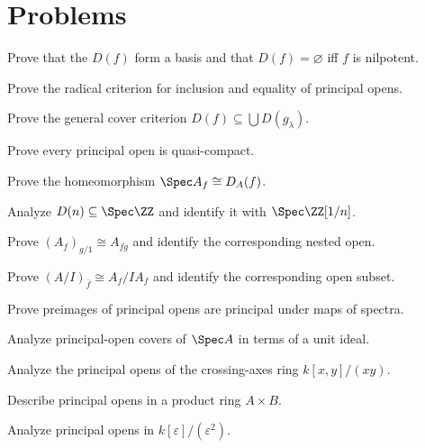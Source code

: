\section{Problems}
\ifdefined\FullProblemDossiers

\else
\begin{problem}Prove that the $D(f)$ form a basis and that $D(f)=\varnothing$ iff $f$ is nilpotent.\end{problem}
\begin{problem}Prove the radical criterion for inclusion and equality of principal opens.\end{problem}
\begin{problem}Prove the general cover criterion $D(f)\subseteq\bigcup D(g_\lambda)$.\end{problem}
\begin{problem}Prove every principal open is quasi-compact.\end{problem}
\begin{problem}Prove the homeomorphism $\Spec A_f\cong D_A(f)$.\end{problem}
\begin{problem}Analyze $D(n)\subseteq\Spec\ZZ$ and identify it with $\Spec\ZZ[1/n]$.\end{problem}
\begin{problem}Prove $(A_f)_{g/1}\cong A_{fg}$ and identify the corresponding nested open.\end{problem}
\begin{problem}Prove $(A/I)_{\bar f}\cong A_f/IA_f$ and identify the corresponding open subset.\end{problem}
\begin{problem}Prove preimages of principal opens are principal under maps of spectra.\end{problem}
\begin{problem}Analyze principal-open covers of $\Spec A$ in terms of a unit ideal.\end{problem}
\begin{problem}Analyze the principal opens of the crossing-axes ring $k[x,y]/(xy)$.\end{problem}
\begin{problem}Describe principal opens in a product ring $A\times B$.\end{problem}
\begin{problem}Analyze principal opens in $k[\varepsilon]/(\varepsilon^2)$.\end{problem}
\fi

